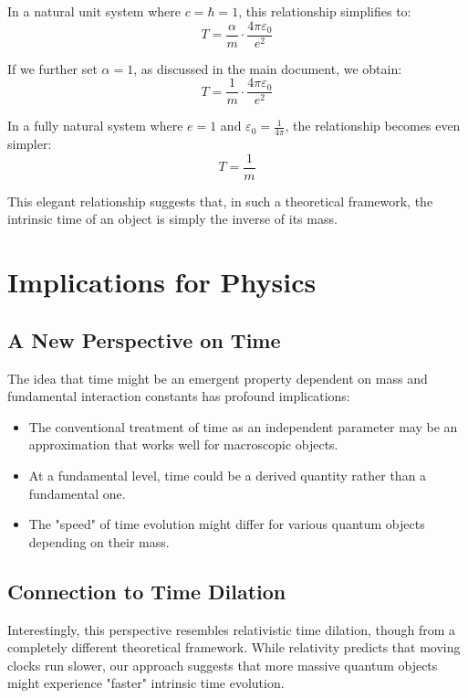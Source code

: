 \documentclass{article}
\begin{document}
	In a natural unit system where $c = \hbar = 1$, this relationship simplifies to:
	\begin{equation}
		T = \frac{\alpha}{m} \cdot \frac{4\pi\varepsilon_0}{e^2}
	\end{equation}
	
	If we further set $\alpha = 1$, as discussed in the main document, we obtain:
	\begin{equation}
		T = \frac{1}{m} \cdot \frac{4\pi\varepsilon_0}{e^2}
	\end{equation}
	
	In a fully natural system where $e = 1$ and $\varepsilon_0 = \frac{1}{4\pi}$, the relationship becomes even simpler:
	\begin{equation}
		T = \frac{1}{m}
	\end{equation}
	
	This elegant relationship suggests that, in such a theoretical framework, the intrinsic time of an object is simply the inverse of its mass.
	
	\section{Implications for Physics}
	
	\subsection{A New Perspective on Time}
	
	The idea that time might be an emergent property dependent on mass and fundamental interaction constants has profound implications:
	\begin{itemize}
		\item The conventional treatment of time as an independent parameter may be an approximation that works well for macroscopic objects.
		\item At a fundamental level, time could be a derived quantity rather than a fundamental one.
		\item The "speed" of time evolution might differ for various quantum objects depending on their mass.
	\end{itemize}
	
	\subsection{Connection to Time Dilation}
	
	Interestingly, this perspective resembles relativistic time dilation, though from a completely different theoretical framework. While relativity predicts that moving clocks run slower, our approach suggests that more massive quantum objects might experience "faster" intrinsic time evolution.
	
\end{document}
